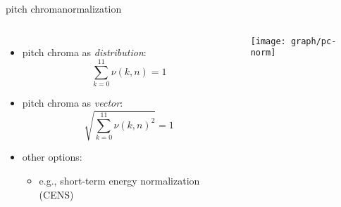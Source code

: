         \begin{frame}{pitch chroma}{normalization}
            \begin{columns}[T]
                    \begin{itemize}
                        \item   pitch chroma as \textit{distribution}:
                            \begin{equation*}
                                \sum\limits_{k=0}^{11}{\nu(k,n)} = 1
                            \end{equation*}
                        \item<2->   pitch chroma as \textit{vector}:
                            \begin{equation*}
                                \sqrt{\sum\limits_{k=0}^{11}{\nu(k,n)^2}} = 1
                            \end{equation*}
                        \item<3-> other options:
                            \begin{itemize}
                                \item   e.g., short-term energy normalization (CENS)
                            \end{itemize}
                    \end{itemize}
                    \texttt{[image: graph/pc-norm]}
            \end{columns}
            
        \end{frame}
        
